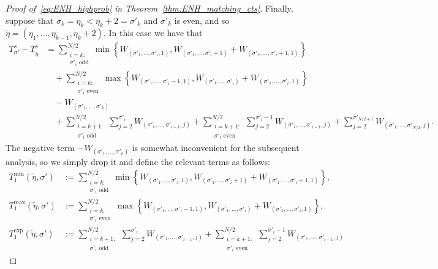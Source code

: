 \documentclass[11pt]{article}
\numberwithin{equation}{section}
\newcommand{\wt}{\widetilde} %
\theoremstyle{definition}
\begin{document}
\begin{proof}[Proof of~\eqref{eq:ENH_highprob} in Theorem~\ref{thm:ENH_matching_cts}]
Finally, 
suppose that 
$\sigma_{k} = \eta_{k} < \eta_{k} +2 = \sigma'_{k}$ 
and 
$\sigma'_{k}$ is even, 
and so 
$\wt{\eta} = \left(\eta_{1}, \ldots, \eta_{k-1}, \eta_{k} + 2 \right)$. 
In this case we have that 
\begin{align*}
T_{\sigma'}^{s} - T_{\wt{\eta}}^{s}
&= \sum_{\substack{i=k: \\ \sigma'_{i} \text{ odd}}}^{N/2} \min \left\{ W_{(\sigma'_1,\ldots,\sigma'_i,1)} , W_{(\sigma'_1,\ldots,\sigma'_i + 1 )} + W_{(\sigma'_1,\ldots,\sigma'_i + 1, 1)} \right\} \\
&\quad + \sum_{\substack{i=k: \\ \sigma'_{i} \text{ even}}}^{N/2} \max \left\{ W_{(\sigma'_1,\ldots,\sigma'_{i}-1,1)} , W_{(\sigma'_1,\ldots,\sigma'_i  )} + W_{(\sigma'_1,\ldots,\sigma'_i, 1)} \right\} \\
&\quad - W_{(\sigma'_{1}, \ldots, \sigma'_{k})} \\
&\quad + \sum_{\substack{i=k+1: \\ \sigma'_{i} \text{ odd}}}^{N/2} \sum_{j=2}^{\sigma'_i} W_{(\sigma'_1,\ldots,\sigma'_{i-1},j)}
    +
    \sum_{\substack{i=k+1: \\ \sigma'_{i} \text{ even}}}^{N/2} \sum_{j=2}^{\sigma'_i-1} W_{(\sigma'_1,\ldots,\sigma'_{i-1},j)} 
    +
    \sum_{j=2}^{\sigma'_{N/2+1}} W_{(\sigma'_1,\ldots,\sigma'_{N/2},j)}.
\end{align*}
The negative term $- W_{(\sigma'_{1}, \ldots, \sigma'_{k})}$ is somewhat inconvenient for the subsequent analysis, so we simply drop it and define the relevant terms as follows: 
\begin{align*}
    T_{1}^{\min}(\wt{\eta}, \sigma') 
    &:= 
    \sum_{\substack{i=k: \\ \sigma'_{i} \text{ odd}}}^{N/2} \min \left\{ W_{(\sigma'_1,\ldots,\sigma'_i,1)} , W_{(\sigma'_1,\ldots,\sigma'_i + 1 )} + W_{(\sigma'_1,\ldots,\sigma'_i + 1, 1)} \right\}, \\
    T_{1}^{\max}(\wt{\eta}, \sigma')
    &:=
    \sum_{\substack{i=k: \\ \sigma'_{i} \text{ even}}}^{N/2} \max \left\{ W_{(\sigma'_1,\ldots,\sigma'_{i}-1,1)} , W_{(\sigma'_1,\ldots,\sigma'_i  )} + W_{(\sigma'_1,\ldots,\sigma'_i, 1)} \right\}, \\
    T_{1}^{\exp}(\wt{\eta}, \sigma')
    &:=
    \sum_{\substack{i=k+1: \\ \sigma'_{i} \text{ odd}}}^{N/2} \sum_{j=2}^{\sigma'_i} W_{(\sigma'_1,\ldots,\sigma'_{i-1},j)}
    +
    \sum_{\substack{i=k+1: \\ \sigma'_{i} \text{ even}}}^{N/2} \sum_{j=2}^{\sigma'_i-1} W_{(\sigma'_1,\ldots,\sigma'_{i-1},j)} 

\end{align*}
\end{proof}
\end{document}
